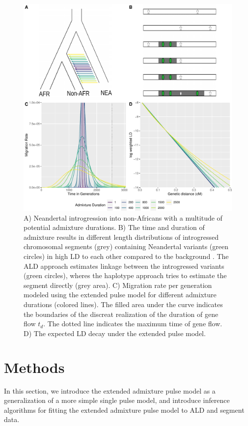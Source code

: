 \documentclass[]{article}
\begin{document}
\begin{figure}
\centering
\includegraphics{Admixture_Time_Inference_Paper_Draft_files/figure-latex/fig1-1.pdf}
\caption{\label{fig:fig1} A) Neandertal introgression into non-Africans with a multitude of potential admixture durations. B) The time and duration of admixture results in different length distributions of introgressed chromosomal segments (grey) containing  Neandertal variants (green circles)  in high LD to each other
compared to the background . The ALD approach estimates linkage
between the introgressed variants (green circles), wheres the haplotype approach tries
to estimate the segment directly (grey area). C) Migration rate per generation
modeled using the extended pulse model for different admixture durations (colored lines). The filled area under the curve indicates the boundaries of the discreat realization of the duration of gene flow $t_d$.
The dotted line indicates the maximum time of gene flow. D) The expected LD decay under the extended pulse model.}
\end{figure}

\section{Methods}\label{methods}
In this section,  we introduce the extended admixture pulse model as a generalization of a more simple single pulse model, and introduce inference algorithms for fitting the extended admixture pulse model to ALD and segment data. 
\end{document}
